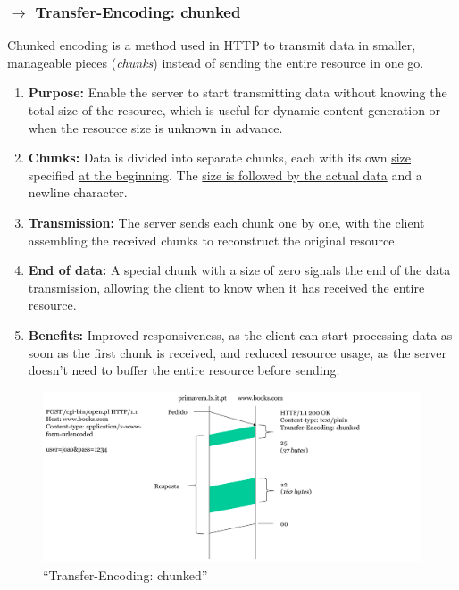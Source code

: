 \clearpage
\subsubsection[2.2.3 Transfer-Encoding: chunked]{$\pmb{\rightarrow}$ Transfer-Encoding: chunked}

Chunked encoding is a method used in HTTP to transmit data in smaller, manageable pieces (\textit{chunks}) instead of sending the entire resource in one go.

\vspace{-0.5em}
\begin{enumerate}
    \item \textbf{Purpose:} Enable the server to start transmitting data without knowing the total size of the resource, which is useful for dynamic content generation or when the resource size is unknown in advance.
    \item \textbf{Chunks:} Data is divided into separate chunks, each with its own \underline{size} specified \underline{at the beginning}. The \underline{size is followed by the actual data} and a newline character.
    \item \textbf{Transmission:} The server sends each chunk one by one, with the client assembling the received chunks to reconstruct the original resource.
    \item \textbf{End of data:} A special chunk with a size of zero signals the end of the data transmission, allowing the client to know when it has received the entire resource.
    \item \textbf{Benefits:} Improved responsiveness, as the client can start processing data as soon as the first chunk is received, and reduced resource usage, as the server doesn't need to buffer the entire resource before sending.
\end{enumerate}

\vspace{-0.75em}
\begin{figure}[H]
    \centering
    \includegraphics[width = 0.9\linewidth]{img/2/chunked-encoding.png}
    \caption{``Transfer-Encoding: chunked''\protect\cite{slidesSobrinho}}
    \label{fig:chunked-encoding}
\end{figure}

